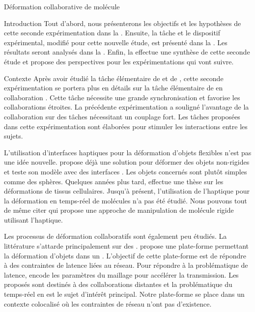\documentclass[myfrancais]{mythesis}
\begin{document}
\begin{mychapter}{Déformation collaborative de molécule}
\begin{mysection}{Introduction}
			Tout d'abord, nous présenterons les objectifs et les hypothèses de cette seconde expérimentation dans la .
			Ensuite, la tâche et le dispositif expérimental, modifié pour cette nouvelle étude, est présenté dans la .
			Les résultats seront analysés dans la .
			Enfin, la  effectue une synthèse de cette seconde étude et propose des perspectives pour les expérimentations qui vont suivre.
		\end{mysection}
		\begin{mysection}{Contexte}
			Après avoir étudié la tâche élémentaire de  et de , cette seconde expérimentation se portera plus en détails sur la tâche élémentaire de  en collaboration .
			Cette tâche nécessite une grande synchronisation et favorise les collaborations étroites.
			La précédente expérimentation  a souligné l'avantage de la collaboration sur des tâches nécessitant un couplage fort.
			Les tâches proposées dans cette expérimentation sont élaborées pour stimuler les interactions entre les sujets.

			L'utilisation d'interfaces haptiques pour la déformation d'objets flexibles n'est pas une idée nouvelle.
			 propose déjà une solution pour déformer des objets non-rigides et teste son modèle avec des interfaces \myOmni.
			Les objets concernés sont plutôt simples comme des sphères.
			Quelques années plus tard,  effectue une thèse sur les déformations de tissus cellulaires.
			Jusqu'à présent, l'utilisation de l'haptique pour la déformation en temps-réel de molécules n'a pas été étudié.
			Nous pouvons tout de même citer  qui propose une approche de manipulation de molécule rigide utilisant l'haptique.

			Les processus de déformation collaboratifs sont également peu étudiés.
			La littérature s'attarde principalement sur des .
			 propose une plate-forme permettant la déformation d'objets dans un .
			L'objectif de cette plate-forme est de répondre à des contraintes de latence liées au réseau.
			Pour répondre à la problématique de latence,  encode les paramètres du maillage pour accélérer la transmission.
			Les  proposés sont destinés à des collaborations distantes et la problématique du temps-réel en est le sujet d'intérêt principal.
			Notre plate-forme se place dans un contexte colocalisé où les contraintes de réseau n'ont pas d'existence.


\end{mysection}
\end{mychapter}
\end{document}
